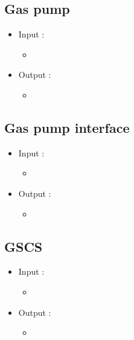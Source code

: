 \documentclass[11pt, a4paper]{article}
\begin{document}
\subsection{Gas pump}

\begin{itemize}
\item Input :
		\begin{itemize}
		\item 
		\end{itemize}

\item Output :
		\begin{itemize}
		\item 
		\end{itemize}
\end{itemize}



\subsection{Gas pump interface}

\begin{itemize}
\item Input :
		\begin{itemize}
		\item 
		\end{itemize}

\item Output :
		\begin{itemize}
		\item 
		\end{itemize}
\end{itemize}



\subsection{GSCS}

\begin{itemize}
\item Input :
		\begin{itemize}
		\item 
		\end{itemize}

\item Output :
		\begin{itemize}
		\item 
		\end{itemize}
\end{itemize}
\end{document}
